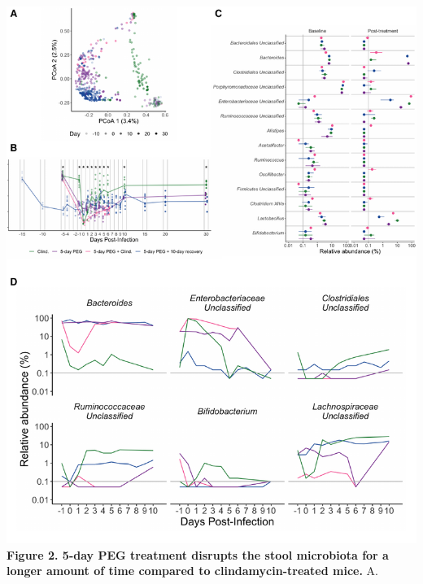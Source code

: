 \documentclass[
  11pt,
]{article}
\begin{document}
\includegraphics{figure_2.pdf} \textbf{Figure 2. 5-day PEG treatment
disrupts the stool microbiota for a longer amount of time compared to
clindamycin-treated mice.} A. \newpage
\end{document}
